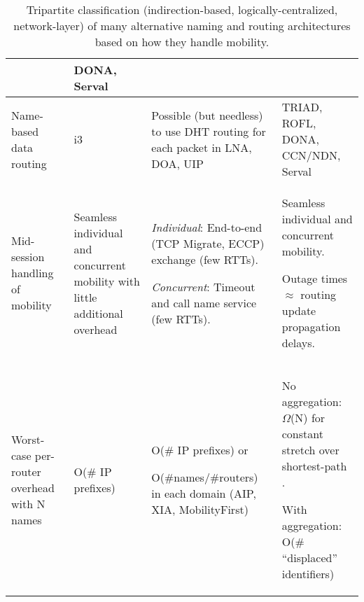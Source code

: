 {\begin{table*}[t]
{\begin{tabular}{|p{1in}|p{1.2in}|p{2.2in}|p{2.1in}|}
\hspace{0.8in}{$\downarrow$All}
& DONA\cite{DONA}, Serval\cite{serval} \\ 
\hline
Name-based data routing & i3\cite{i3}  & Possible (but needless) to use DHT routing for each packet in LNA\cite{LNA}, DOA\cite{DOA}, UIP\cite{UIP} & TRIAD\cite{TRIAD}, ROFL\cite{ROFL}, DONA\cite{DONA}, CCN/NDN\cite{CCN,NDN}, Serval\cite{serval} \\
\hline
Mid-session handling of mobility  &  Seamless individual and concurrent mobility with little additional overhead & {\em Individual}: End-to-end (TCP Migrate\cite{Migrate}, ECCP\cite{ECCP}) exchange (few RTTs).

{\em Concurrent}: Timeout and call name service (few RTTs).& 
Seamless individual and concurrent mobility.
   
Outage times $\approx$ routing update propagation delays. \\
\hline
Worst-case per-router overhead with N names &  O(\# IP prefixes) & O(\# IP prefixes) or

 O(\#names/\#routers) in each domain (AIP\cite{AIP}, XIA\cite{XIA}, MobilityFirst\cite{MobilityFirst-UMASS})& No aggregation: $\Omega$(N) for constant stretch over shortest-path \cite{compact-routing}.

With aggregation: O(\# ``displaced'' identifiers)\\
 \hline
\end{tabular}
}
\vspace{-0.15in}
\caption{Tripartite classification (indirection-based, logically-centralized, network-layer) of many alternative naming and routing architectures based on how they handle mobility.}
\vspace{-0.1in}
\label{tab:arch}
\end{table*}


}
